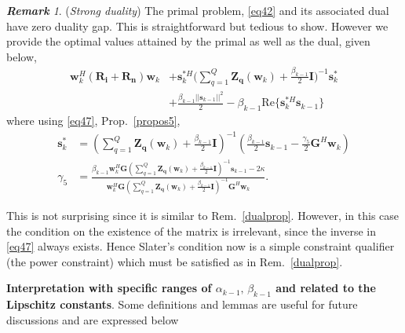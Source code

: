 \documentclass[11pt,draftclsnofoot,onecolumn]{IEEEtran}
\theoremstyle{definition}
\theoremstyle{remark}
\newtheorem{remk}{\bf Remark}
\begin{document}
\begin{remk} \label{remstrongdual}
({\it Strong duality}) The primal problem, \eqref{eq42} and its associated dual have zero duality gap. This is straightforward but tedious to show. However we provide the optimal values attained by the primal as well as the dual, given below,
\begin{align} \label{dualopt2}
\mathbf{w}_k^H(\mathbf{R_i+R_n })\mathbf{w}_k&+\mathbf{s}_k^{\ast H} \big( \sum\limits_{q=1}^Q\mathbf{Z_q}(\mathbf{w}_{k})+\frac{\beta_{k-1}}{2}\mathbf{I}\big)^{-1} \mathbf{s}_k^{\ast} \nonumber \\
&+\frac{\beta_{k-1} || \mathbf{s}_{k-1}||^2}{2}  
-\beta_{k-1}\mbox{Re}\{ \mathbf{s}_{k}^{\ast H} \mathbf{s}_{k-1}\}
\end{align}
where using \eqref{eq47}, Prop.~\ref{propos5}, 
\begin{equation*}
\begin{aligned}
\mathbf{s}_{k}^{\ast}&=(\sum\limits_{q=1}^Q\mathbf{Z_q}(\mathbf{w}_{k})+\frac{\beta_{k-1}}{2}\mathbf{I})^{-1} ( \frac{\beta_{k-1}}{2}\mathbf{s}_{k-1} -\frac{\gamma_5}{2}\mathbf{G}^H\mathbf{w}_{k}) \\
 \gamma_5&=\frac{\beta_{k-1}\mathbf{w}_{k}^H\mathbf{G} ( \sum\limits_{q=1}^Q\mathbf{Z_q}(\mathbf{w}_{k})+\frac{\beta_{k-1}}{2}\mathbf{I})^{-1} \mathbf{s}_{k-1}-2\kappa} {\mathbf{w}_{k}^H\mathbf{G} ( \sum\limits_{q=1}^Q\mathbf{Z_q}(\mathbf{w}_{k})+\frac{\beta_{k-1}}{2}\mathbf{I})^{-1} \mathbf{G}^H\mathbf{w}_{k} }.
 \end{aligned}
 \end{equation*}
\end{remk}
This is not surprising since it is similar to Rem.~\ref{dualprop}. However, in this case the condition on the existence of the matrix is irrelevant, since the inverse in \eqref{eq47} always exists. Hence Slater's condition now is a simple constraint qualifier (the power constraint) which must be satisfied as in Rem.~\ref{dualprop}.

{\bf Interpretation with specific ranges of $\alpha_{k-1},\,\beta_{k-1}$ and related to the Lipschitz constants}. Some definitions and lemmas are useful for future discussions and are expressed below
 
\end{document}
